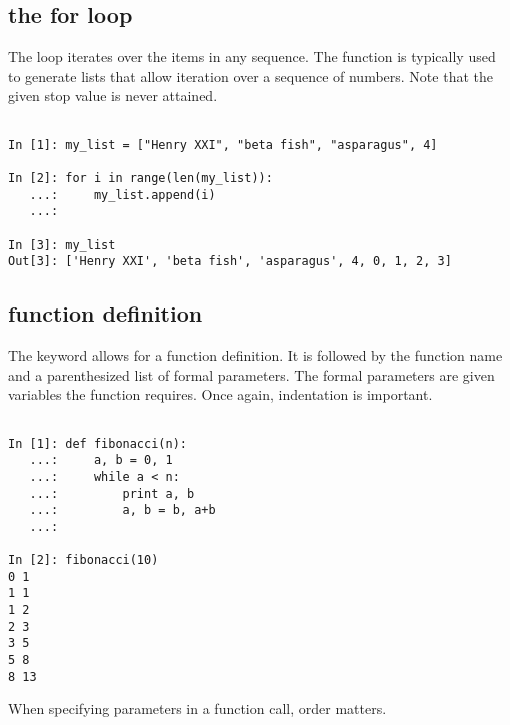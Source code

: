 \subsection*{the for loop}
\begin{example}

The  loop iterates over the items in any sequence. 
The  function is typically used to generate lists that allow iteration 
over a sequence of numbers. Note that the given stop value is never attained. 

\begin{lstlisting}

In [1]: my_list = ["Henry XXI", "beta fish", "asparagus", 4]

In [2]: for i in range(len(my_list)):
   ...:     my_list.append(i)
   ...:     

In [3]: my_list
Out[3]: ['Henry XXI', 'beta fish', 'asparagus', 4, 0, 1, 2, 3]

\end{lstlisting}
\end{example}


\subsection*{function definition}
\begin{example}

The  keyword allows for a function definition. It is followed by 
the function name and a parenthesized list of formal parameters.
The formal parameters are given variables the function requires. 
Once again, indentation is important. 

\begin{lstlisting}

In [1]: def fibonacci(n):
   ...:     a, b = 0, 1
   ...:     while a < n:
   ...:         print a, b
   ...:         a, b = b, a+b
   ...:         

In [2]: fibonacci(10)
0 1
1 1
1 2
2 3
3 5
5 8
8 13

\end{lstlisting}
\end{example}

When specifying parameters in a function call, order matters.   

